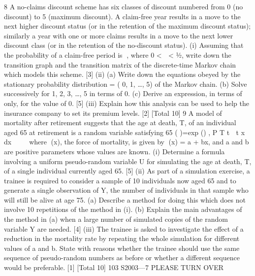 

8 A no-claims discount scheme has six classes of discount numbered from 0 (no
discount) to 5 (maximum discount). A claim-free year results in a move to the next
higher discount status (or in the retention of the maximum discount status); similarly a
year with one or more claims results in a move to the next lower discount class (or in
the retention of the no-discount status).
(i) Assuming that the probability of a claim-free period is , where 0 <  < ½,
write down the transition graph and the transition matrix of the discrete-time
Markov chain which models this scheme. [3]
(ii) (a) Write down the equations obeyed by the stationary probability
distribution 
 = (
0, 
1, …, 
5) of the Markov chain.
(b) Solve successively for 
1, 
2, 
3, …, 
5 in terms of 
0.
(c) Derive an expression, in terms of  only, for the value of 
0.
[5]
(iii) Explain how this analysis can be used to help the insurance company to set its
premium levels. [2]
[Total 10]
9 A model of mortality after retirement suggests that the age at death, T, of an
individual aged 65 at retirement is a random variable satisfying
65
( )=exp () ,
P T t  t x dx     
 	 
where (x), the force of mortality, is given by (x) = a + bx, and a and b are positive
parameters whose values are known.
(i) Determine a formula involving a uniform pseudo-random variable U for
simulating the age at death, T, of a single individual currently aged 65. [5]
(ii) As part of a simulation exercise, a trainee is required to consider a sample of
10 individuals now aged 65 and to generate a single observation of Y, the
number of individuals in that sample who will still be alive at age 75.
(a) Describe a method for doing this which does not involve 10 repetitions
of the method in (i).
(b) Explain the main advantages of the method in (a) when a large number
of simulated copies of the random variable Y are needed. [4]
(iii) The trainee is asked to investigate the effect of a reduction in the mortality rate
by repeating the whole simulation for different values of a and b. State with
reasons whether the trainee should use the same sequence of pseudo-random
numbers as before or whether a different sequence would be preferable. [1]
[Total 10]
103 S2003—7 PLEASE TURN OVER

